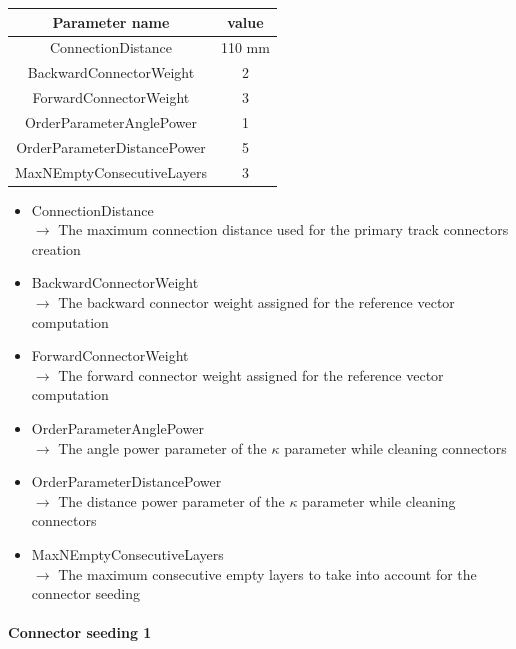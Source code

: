 \documentclass[cits]{JINST}
\begin{document}
\begin{table}[!ht]
  \begin{center}
    \begin{tabu} to \linewidth { c | c } 
          Parameter name & value \\
          \hline
          ConnectionDistance & 110 mm \\ 
          BackwardConnectorWeight & 2 \\ 
          ForwardConnectorWeight & 3 \\ 
          OrderParameterAnglePower & 1 \\ 
          OrderParameterDistancePower & 5 \\
          MaxNEmptyConsecutiveLayers & 3 
    \end{tabu} 
  \end{center}
\end{table}

\begin{itemize}
  \item ConnectionDistance \\
  $\rightarrow$ The maximum connection distance used for the primary track connectors creation
  \item BackwardConnectorWeight \\
  $\rightarrow$ The backward connector weight assigned for the reference vector computation
  \item ForwardConnectorWeight \\
  $\rightarrow$ The forward connector weight assigned for the reference vector computation
  \item OrderParameterAnglePower \\ 
  $\rightarrow$ The angle power parameter of the $\kappa$ parameter while cleaning connectors
  \item OrderParameterDistancePower \\
  $\rightarrow$ The distance power parameter of the $\kappa$ parameter while cleaning connectors
  \item MaxNEmptyConsecutiveLayers \\
  $\rightarrow$ The maximum consecutive empty layers to take into account for the connector seeding
\end{itemize}


\paragraph{Connector seeding 1} ~
\end{document}
